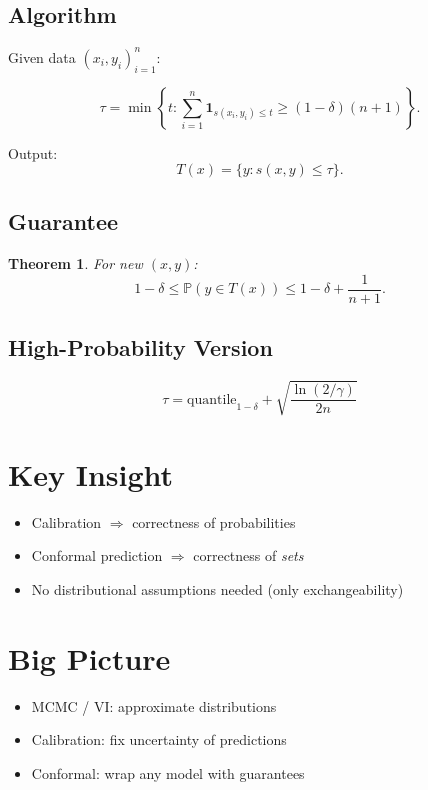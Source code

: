 \documentclass[12pt,oneside]{book}
\numberwithin{equation}{section}
\theoremstyle{definition}
\theoremstyle{plain}
\newtheorem{theorem}{Theorem}[section]
\theoremstyle{remark}
\begin{document}
\subsection{Algorithm}

Given data $(x_i,y_i)_{i=1}^n$:

\[
\tau = \min \left\{
t:\sum_{i=1}^n \mathbf{1}_{s(x_i,y_i)\le t}
\ge (1-\delta)(n+1)
\right\}.
\]

Output:
\[
T(x) = \{y: s(x,y)\le \tau\}.
\]

\subsection{Guarantee}

\begin{theorem}
For new $(x,y)$:
\[
1-\delta \le \mathbb{P}(y \in T(x)) \le 1-\delta + \frac{1}{n+1}.
\]
\end{theorem}

\subsection{High-Probability Version}

\[
\tau = \text{quantile}_{1-\delta} + \sqrt{\frac{\ln(2/\gamma)}{2n}}
\]

\section{Key Insight}

\begin{itemize}
    \item Calibration $\Rightarrow$ correctness of probabilities
    \item Conformal prediction $\Rightarrow$ correctness of \textit{sets}
    \item No distributional assumptions needed (only exchangeability)
\end{itemize}

\section{Big Picture}

\begin{itemize}
    \item MCMC / VI: approximate distributions
    \item Calibration: fix uncertainty of predictions
    \item Conformal: wrap any model with guarantees
\end{itemize}
\end{document}
